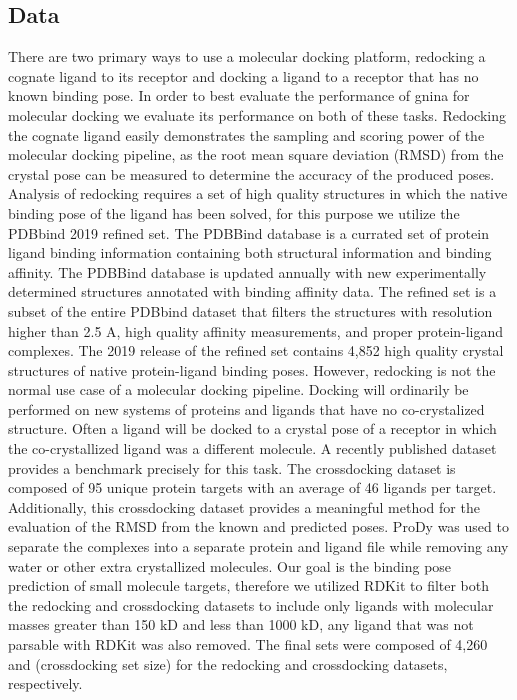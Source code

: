 \documentclass[journal=jcisd8,manuscript=article]{achemso}
\begin{document}
\subsection{Data}
There are two primary ways to use a molecular docking platform, redocking a cognate ligand to its receptor and docking a ligand to a receptor that has no known binding pose. In order to best evaluate the performance of gnina for molecular docking we evaluate its performance on both of these tasks. Redocking the cognate ligand easily demonstrates the sampling and scoring power of the molecular docking pipeline, as the root mean square deviation (RMSD) from the crystal pose can be measured to determine the accuracy of the produced poses. Analysis of redocking requires a set of high quality structures in which the native binding pose of the ligand has been solved, for this purpose we utilize the PDBbind 2019 refined set. The PDBBind database is a currated set of protein ligand binding information containing both structural information and binding affinity. The PDBBind database is updated annually with new experimentally determined structures annotated with binding affinity data. The refined set is a subset of the entire PDBbind dataset that filters the structures with resolution higher than 2.5 A, high quality affinity measurements, and proper protein-ligand complexes. The 2019 release of the refined set contains 4,852 high quality crystal structures of native protein-ligand binding poses. However, redocking is not the normal use case of a molecular docking pipeline. Docking will ordinarily be performed on new systems of proteins and ligands that have no co-crystalized structure. Often a ligand will be docked to a crystal pose of a receptor in which the co-crystallized ligand was a different molecule. A recently published dataset provides a benchmark precisely for this task\cite{wierbowski2020cross}. The crossdocking dataset is composed of 95 unique protein targets with an average of 46 ligands per target. Additionally, this crossdocking dataset provides a meaningful method for the evaluation of the RMSD from the known and predicted poses. ProDy\cite{bakan2011prody} was used to separate the complexes into a separate protein and ligand file while removing any water or other extra crystallized molecules. Our goal is the binding pose prediction of small molecule targets, therefore we utilized RDKit\cite{rdkit} to filter both the redocking and crossdocking datasets to include only ligands with molecular masses greater than 150 kD and less than 1000 kD, any ligand that was not parsable with RDKit was also removed. The final sets were composed of 4,260 and (crossdocking set size) for the redocking and crossdocking datasets, respectively.
\end{document}
